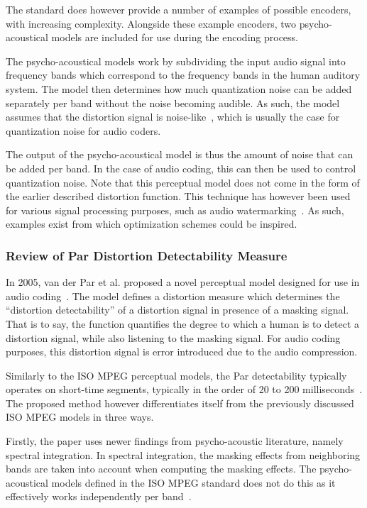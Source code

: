 The standard does however provide a number of examples of possible encoders, with increasing complexity.
Alongside these example encoders, two psycho-acoustical models are included for use during the encoding process. 

The psycho-acoustical models work by subdividing the input audio signal into frequency bands which correspond to the 
frequency bands in the human auditory system.
The model then determines how much quantization noise can be added separately per band without the noise becoming audible.
As such, the model assumes that the distortion signal is noise-like~\cite{van2005perceptual}, which is usually
the case for quantization noise for audio coders.

The output of the psycho-acoustical model is thus the amount of noise that can be added per band.
In the case of audio coding, this can then be used to control quantization noise.
Note that this perceptual model does not come in the form of the earlier described distortion function.
This technique has however been used for various signal processing purposes, 
such as audio watermarking~\cite{taal2012low}.
As such, examples exist from which optimization schemes could be inspired.

\subsubsection{Review of Par Distortion Detectability Measure}
In 2005, van der Par et al. proposed a novel perceptual model designed for use in audio coding~\cite{van2005perceptual}.
The model defines a distortion measure which determines the ``distortion detectability'' of a distortion signal 
in presence of a masking signal.
That is to say, the function quantifies the degree to which a human is to detect a distortion signal, while also
listening to the masking signal.
For audio coding purposes, this distortion signal is error introduced due to the audio compression.

Similarly to the ISO MPEG perceptual models, the Par detectability typically operates on short-time segments, 
typically in the order of 20 to 200 milliseconds~\cite{van2005perceptual}.
The proposed method however differentiates itself from the previously discussed ISO MPEG models in three ways.

Firstly, the paper uses newer findings from psycho-acoustic literature, namely spectral integration.
In spectral integration, the masking effects from neighboring bands are taken into account when computing the 
masking effects.
The psycho-acoustical models defined in the ISO MPEG standard does not do this as it effectively 
works independently per band~\cite{taal2012low}.


